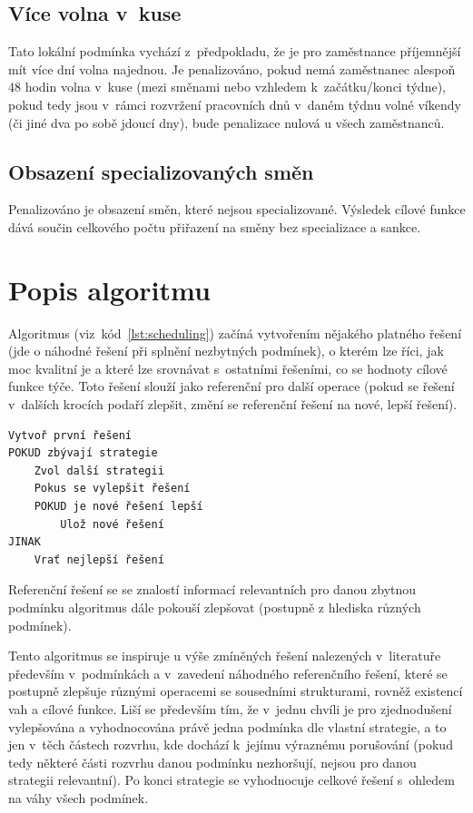 \documentclass[twoside]{ctuthesis}
\begin{document}
\subsection{Více volna v~kuse}
Tato lokální podmínka vychází z~předpokladu, že je pro zaměstnance příjemnější mít více dní volna najednou. Je penalizováno, pokud nemá zaměstnanec alespoň 48 hodin volna v~kuse (mezi směnami nebo vzhledem k~začátku/konci týdne), pokud tedy jsou v~rámci rozvržení pracovních dnů v~daném týdnu volné víkendy (či jiné dva po sobě jdoucí dny), bude penalizace nulová u všech zaměstnanců.

\subsection{Obsazení specializovaných směn}
Penalizováno je obsazení směn, které nejsou specializované. Výsledek cílové funkce dává součin celkového počtu přiřazení na směny bez specializace a sankce.

\section{Popis algoritmu}
Algoritmus (viz~kód~\ref{lst:scheduling}) začíná vytvořením nějakého platného řešení (jde o náhodné řešení při splnění nezbytných podmínek), o kterém lze říci, jak moc kvalitní je a které lze srovnávat s~ostatními řešeními, co se hodnoty cílové funkce týče. Toto řešení slouží jako referenční pro další operace (pokud se řešení v~dalších krocích podaří zlepšit, změní se referenční řešení na nové, lepší řešení).


\begin{lstlisting}[caption={Pseudokód rozvrhovacího algoritmu}, label={lst:scheduling}]
Vytvoř první řešení
POKUD zbývají strategie
	Zvol další strategii
	Pokus se vylepšit řešení
	POKUD je nové řešení lepší
		Ulož nové řešení
JINAK
	Vrať nejlepší řešení
\end{lstlisting}

Referenční řešení se se znalostí informací relevantních pro danou zbytnou podmínku algoritmus dále pokouší zlepšovat (postupně z hlediska různých podmínek).

Tento algoritmus se inspiruje u výše zmíněných řešení nalezených v~literatuře především v~podmínkách a v~zavedení náhodného referenčního řešení, které se postupně zlepšuje různými operacemi se sousedními strukturami, rovněž existencí vah a cílové funkce. Liší se především tím, že v~jednu chvíli je pro zjednodušení vylepšována a vyhodnocována právě jedna podmínka dle vlastní strategie, a to jen v~těch částech rozvrhu, kde dochází k~jejímu výraznému porušování (pokud tedy některé části rozvrhu danou podmínku nezhoršují, nejsou pro danou strategii relevantní). Po konci strategie se vyhodnocuje celkové řešení s~ohledem na váhy všech podmínek.
\end{document}
